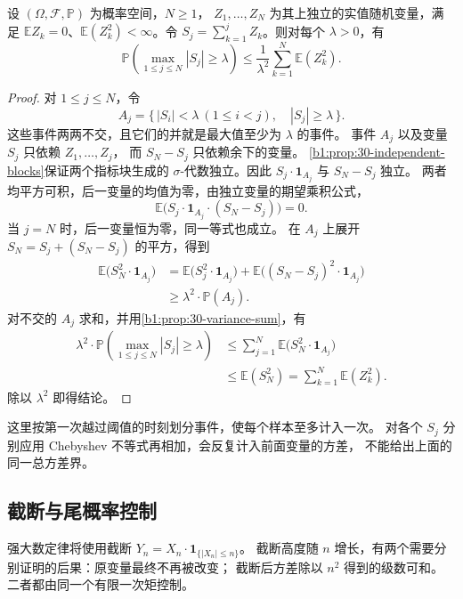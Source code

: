 \begin{theorem}
\label{b1:thm:30-kolmogorov-maximal}
设 \((\Omega,\mathcal F,\mathbb P)\) 为概率空间，\(N\geq1\)，
\(Z_1,\ldots,Z_N\) 为其上独立的实值随机变量，满足
\(\mathbb E Z_k=0\)、\(\mathbb E(Z_k^2)<\infty\)。令
\(S_j=\sum_{k=1}^jZ_k\)。则对每个 \(\lambda>0\)，有
\[
 \mathbb P\left(\max_{1\leq j\leq N}|S_j|\geq\lambda\right)
 \leq\frac1{\lambda^2}\sum_{k=1}^N\mathbb E(Z_k^2).
\]
\end{theorem}
\begin{proof}
对 \(1\leq j\leq N\)，令
\[
 A_j=\{\,|S_i|<\lambda\ (1\leq i<j),\quad |S_j|\geq\lambda\,\}.
\]
这些事件两两不交，且它们的并就是最大值至少为 \(\lambda\) 的事件。
事件 \(A_j\) 以及变量 \(S_j\) 只依赖 \(Z_1,\ldots,Z_j\)，
而 \(S_N-S_j\) 只依赖余下的变量。
\cref{b1:prop:30-independent-blocks}保证两个指标块生成的
\(\sigma\)-代数独立。因此
\(S_j\cdot\mathbf1_{A_j}\) 与 \(S_N-S_j\) 独立。
两者均平方可积，后一变量的均值为零，由独立变量的期望乘积公式，
\[
 \mathbb E\bigl(S_j\cdot\mathbf1_{A_j}\cdot(S_N-S_j)\bigr)=0.
\]
当 \(j=N\) 时，后一变量恒为零，同一等式也成立。
在 \(A_j\) 上展开 \(S_N=S_j+(S_N-S_j)\) 的平方，得到
\[
 \begin{aligned}
 \mathbb E\bigl(S_N^2\cdot\mathbf1_{A_j}\bigr)
 &=\mathbb E\bigl(S_j^2\cdot\mathbf1_{A_j}\bigr)
   +\mathbb E\bigl((S_N-S_j)^2\cdot\mathbf1_{A_j}\bigr)\\
 &\geq\lambda^2\cdot\mathbb P(A_j).
 \end{aligned}
\]
对不交的 \(A_j\) 求和，并用\cref{b1:prop:30-variance-sum}，有
\[
 \begin{aligned}
 \lambda^2\cdot
 \mathbb P\left(\max_{1\leq j\leq N}|S_j|\geq\lambda\right)
 &\leq\sum_{j=1}^N\mathbb E\bigl(S_N^2\cdot\mathbf1_{A_j}\bigr)\\
 &\leq\mathbb E(S_N^2)
 =\sum_{k=1}^N\mathbb E(Z_k^2).
 \end{aligned}
\]
除以 \(\lambda^2\) 即得结论。
\end{proof}

这里按第一次越过阈值的时刻划分事件，使每个样本至多计入一次。
对各个 \(S_j\) 分别应用 Chebyshev 不等式再相加，会反复计入前面变量的方差，
不能给出上面的同一总方差界。

\subsection{截断与尾概率控制}
\label{b1:subsec:300502}

强大数定律将使用截断 \(Y_n=X_n\cdot\mathbf1_{\{|X_n|\leq n\}}\)。
截断高度随 \(n\) 增长，有两个需要分别证明的后果：原变量最终不再被改变；
截断后方差除以 \(n^2\) 得到的级数可和。二者都由同一个有限一次矩控制。

